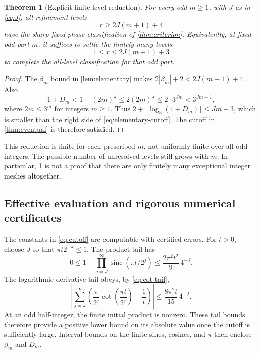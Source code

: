 \documentclass[11pt,a4paper]{article}
\numberwithin{equation}{section}
\theoremstyle{plain}
\newtheorem{theorem}{Theorem}[section]
\theoremstyle{definition}
\theoremstyle{remark}
\newcommand{\sinc}{\operatorname{sinc}}
\newcommand{\abs}[1]{\left|#1\right|}
\begin{document}
\begin{theorem}[Explicit finite-level reduction]
\label{thm:elementary}
For every odd $m\ge1$, with $J$ as in \eqref{eq:J}, all refinement levels
\begin{equation}\label{eq:elementary-cutoff}
 r\ge 2J(m+1)+4
\end{equation}
have the sharp fixed-phase classification of \cref{thm:criterion}.
Equivalently, at fixed odd part $m$, it suffices to settle the finitely many
levels
\begin{equation}\label{eq:finite-levels}
 1\le r\le 2J(m+1)+3
\end{equation}
to complete the all-level classification for that odd part.
\end{theorem}
\begin{proof}
The $\beta_m$ bound in \cref{lem:elementary} makes
$2|\beta_m|+2<2J(m+1)+4$. Also
\[
 1+D_m<1+(2m)^J\le2(2m)^J\le2\cdot3^{Jm}<3^{Jm+1},
\]
where $2m\le3^m$ for integers $m\ge1$. Thus
$2+\lceil\log_3(1+D_m)\rceil\le Jm+3$, which is smaller than the
right side of \eqref{eq:elementary-cutoff}. The cutoff in
\cref{thm:eventual} is therefore satisfied.
\end{proof}

This reduction is finite for each prescribed $m$, not uniformly finite
over all odd integers. The possible number of unresolved levels still
grows with $m$. In particular, \cref{thm:elementary} is not a proof that
there are only finitely many exceptional integer meshes altogether.

\subsection{Effective evaluation and rigorous numerical certificates}

The constants in \eqref{eq:cutoff} are computable with certified errors.
For $t>0$, choose $J$ so that $\pi t2^{-J}\le1$. The product tail has
\begin{equation}\label{eq:product-tail}
 0\le1-\prod_{j=J}^{\infty}\sinc(\pi t/2^j)
 \le\frac{2\pi^2t^2}{9}\,4^{-J}.
\end{equation}
The logarithmic-derivative tail obeys, by \eqref{eq:cot-tail},
\begin{equation}\label{eq:log-tail}
 \abs{\sum_{j=J}^{\infty}
 \left(\frac\pi{2^j}\cot\!\left(\frac{\pi t}{2^j}\right)-\frac1t\right)}
 \le\frac{8\pi^2t}{15}\,4^{-J}.
\end{equation}
At an odd half-integer, the finite initial product is nonzero. These tail
bounds therefore provide a positive lower bound on its absolute value
once the cutoff is sufficiently large. Interval bounds on the finite
sines, cosines, and $\pi$ then enclose $\beta_m$ and $D_m$.
\end{document}
